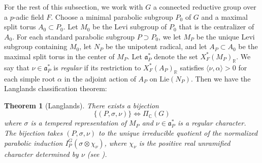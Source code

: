 \documentclass[reqno,11pt]{amsart}
\newtheorem{theorem}{Theorem}[section]
\theoremstyle{remark}
\newcommand{\R}{\mathbb{R}}
\newcommand{\C}{\mathbb{C}}
\newcommand{\mf}{\mathfrak}
\newcommand{\Lie}{\mathrm{Lie}}
\begin{document}
For the rest of this subsection, we work with $G$ a connected reductive group over a $p$-adic field $F$. Choose a minimal parabolic subgroup $P_0$ of $G$ and a maximal split torus $A_0 \subset P_0$. Let $M_0$ be the Levi subgroup of $P_0$ that is the centralizer of $A_0$. For each standard parabolic subgroup $P \supset P_0$, we let $M_P$ be the unique Levi subgroup containing $M_0$, let $N_P$ be the unipotent radical, and let $A_P \subset A_0$ be the maximal split torus in the center of $M_P$. Let $\mf{a}^*_P$ denote the set $X^*_F(M_P)_{\R}$. We say that $\nu \in \mf{a}^*_P$ is \emph{regular} if its restriction to $X^*_F(A_P)_{\R}$ satisfies $\langle \nu, \alpha \rangle > 0$ for each simple root $\alpha$ in the adjoint action of $A_P$ on $\Lie(N_P)$. Then we have the Langlands classification theorem:
\begin{theorem}[Langlands]{\label{thm: Langlandsclassification}}
There exists a bijection
\begin{equation*}
    \{(P, \sigma, \nu)\} \Longleftrightarrow \Pi_{\C}(G)
\end{equation*}
where $\sigma$ is a tempered representation of $M_P$ and $\nu \in \mf{a}^*_P$ is a regular character. The bijection takes $(P,\sigma, \nu)$ to the unique irreducible quotient of the normalized parabolic induction $I^G_P(\sigma \otimes \chi_{\nu})$, where $\chi_{
\nu}$ is the positive real unramified character determined by $\nu$ (see \cite[\S1.2]{SZ}).
\end{theorem}
\end{document}
